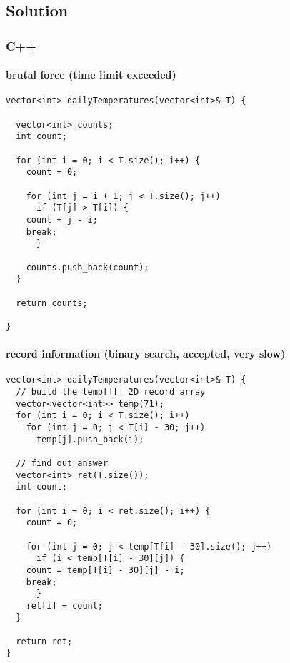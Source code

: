 \documentclass[12pt]{article}
\begin{document}
\subsection{Solution}
\label{sec:org878389c}
\subsubsection{C++}
\label{sec:orgc25c98c}
\paragraph{brutal force (time limit exceeded)}
\label{sec:org7fa2edf}
\begin{verbatim}
vector<int> dailyTemperatures(vector<int>& T) {

  vector<int> counts;
  int count;

  for (int i = 0; i < T.size(); i++) {
    count = 0;

    for (int j = i + 1; j < T.size(); j++) 
      if (T[j] > T[i]) {
	count = j - i;
	break;
      }

    counts.push_back(count);
  }

  return counts;

}

\end{verbatim}
\paragraph{record information (binary search, accepted, very slow)}
\label{sec:org7c87cc6}
\begin{verbatim}
vector<int> dailyTemperatures(vector<int>& T) {
  // build the temp[][] 2D record array 
  vector<vector<int>> temp(71);
  for (int i = 0; i < T.size(); i++)
    for (int j = 0; j < T[i] - 30; j++)
      temp[j].push_back(i);

  // find out answer
  vector<int> ret(T.size());
  int count;

  for (int i = 0; i < ret.size(); i++) {
    count = 0;

    for (int j = 0; j < temp[T[i] - 30].size(); j++)
      if (i < temp[T[i] - 30][j]) {
	count = temp[T[i] - 30][j] - i;
	break;
      }
    ret[i] = count;
  }

  return ret;
}

\end{verbatim}
\end{document}
